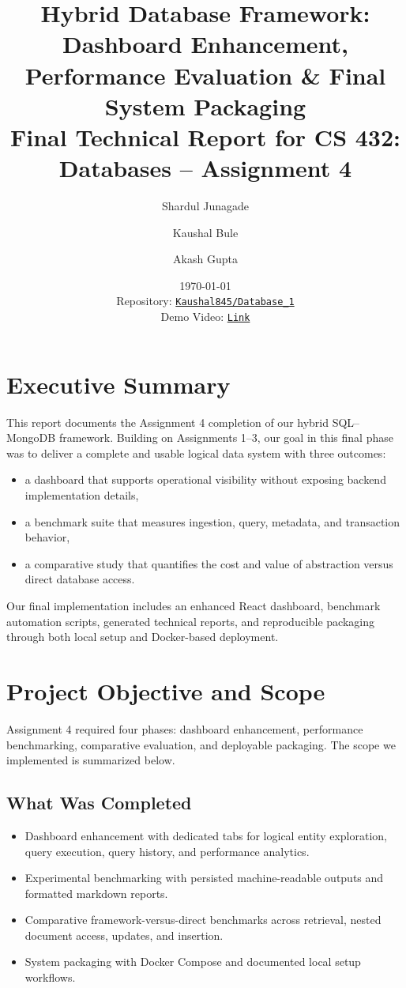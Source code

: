 \documentclass[12pt,a4paper]{article}
\title{\textbf{Hybrid Database Framework: Dashboard Enhancement, Performance Evaluation \& Final System Packaging}\\[0.5em]
\large Final Technical Report for CS 432: Databases -- Assignment 4}
\author{Shardul Junagade \and Kaushal Bule \and Akash Gupta}
\date{\today\\[0.3em]
\small Repository: \href{https://github.com/Kaushal845/Database_1}{\texttt{Kaushal845/Database\_1}}\\
\small Demo Video: \href{https://iitgnacin-my.sharepoint.com/:f:/g/personal/23110297_iitgn_ac_in/IgDDmiFkmFkmR7hBAn1lU5eCAbu1oP6PjvDP1tLCpSnHi_U?e=q0TZgy}{\texttt{Link}}}
\begin{document}
\maketitle
{}   %

{
\tableofcontents
}
\newpage

\section{Executive Summary}
This report documents the Assignment 4 completion of our hybrid SQL--MongoDB framework. Building on Assignments 1--3, our goal in this final phase was to deliver a complete and usable logical data system with three outcomes:
\begin{itemize}
	\item a dashboard that supports operational visibility without exposing backend implementation details,
	\item a benchmark suite that measures ingestion, query, metadata, and transaction behavior,
	\item a comparative study that quantifies the cost and value of abstraction versus direct database access.
\end{itemize}

Our final implementation includes an enhanced React dashboard, benchmark automation scripts, generated technical reports, and reproducible packaging through both local setup and Docker-based deployment.

\section{Project Objective and Scope}
Assignment 4 required four phases: dashboard enhancement, performance benchmarking, comparative evaluation, and deployable packaging. The scope we implemented is summarized below.

\subsection{What Was Completed}
\begin{itemize}
	\item Dashboard enhancement with dedicated tabs for logical entity exploration, query execution, query history, and performance analytics.
	\item Experimental benchmarking with persisted machine-readable outputs and formatted markdown reports.
	\item Comparative framework-versus-direct benchmarks across retrieval, nested document access, updates, and insertion.
	\item System packaging with Docker Compose and documented local setup workflows.
\end{itemize}
\end{document}
